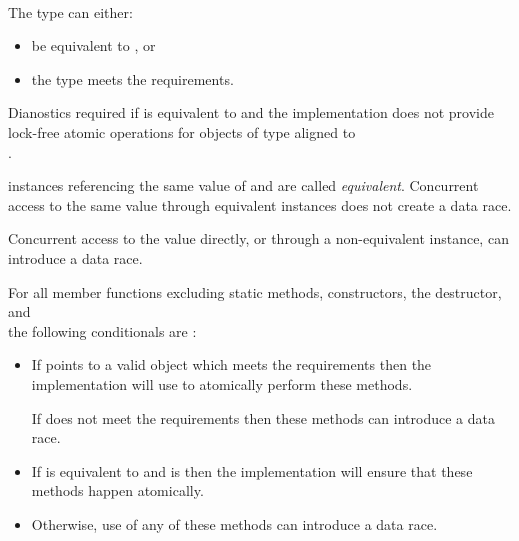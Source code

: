  \\

\begin{addedblock}
\pnum
The type  can either:
\begin{itemize}
\item be equivalent to , or
\item the type  meets the  requirements.  
\end{itemize}
Dianostics required if  is equivalent to  
and the implementation does not provide lock-free atomic
operations for objects of type  aligned to \\
.

\pnum
{} instances referencing the same value of  and  are 
called \textit{equivalent}. Concurrent access to the same value through 
equivalent  instances does not create a data race. 
\begin{note} Concurrent access to the value directly, or through a non-equivalent
 instance, can introduce a data race.
\end{note}

\pnum
For all  member functions excluding static methods, constructors, 
the destructor, and \\  the following conditionals are :
\begin{itemize}
\item If  points to a valid  object which meets the 
   requirements then 
  the implementation will use  to atomically perform these methods.
  \begin{note}If  does not meet the  requirements then 
  these methods can introduce a data race. \end{note}
\item If  is equivalent to  and
   is  then
  the implementation will ensure that these methods happen atomically.
\item Otherwise, use of any of these methods can introduce a data race. 
\end{itemize}
\end{addedblock}

